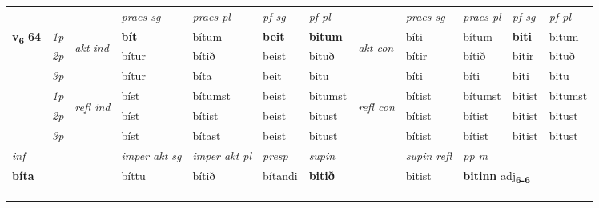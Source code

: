 \begin{longtable}[l]{X>{\footnotesize\itshape}llXXXXlXXXX}
 & &   & \textit{praes sg}  & \textit{praes pl}    & \textit{ pf sg} & \textit{pf pl} & & \textit{praes sg}  & \textit{praes pl}    & \textit{pf sg} & \textit{pf pl }  \\ \cmidrule{4-7} \cmidrule{9-12}
 \multirow{2}{*}{{{\textbf{v{\textsubscript{6}}} \Large{\textbf{64}}}}}  & 1p & \multirow{3}{*}{\begin{turn}{90}\textit{akt ind}\end{turn}} & \textbf{bít} & bítum & \textbf{beit} & \textbf{bitum} & \multirow{3}{*}{\begin{turn}{90}\textit{akt con}\end{turn}} &bíti & bítum & \textbf{biti} & bitum\\*
 & 2p &  &  bítur  & bítið & beist & bituð & & bítir & bítið & bitir & bituð \\*
 & 3p &  & bítur & bíta & beit & bitu & & bíti & bíti& biti & bitu \\*
\cmidrule{4-7} \cmidrule{9-12}
 & 1p & \multirow{3}{*}{\begin{turn}{90}\textit{refl ind}\end{turn}}  & bíst & bítumst & beist & bitumst & \multirow{3}{*}{\begin{turn}{90}\textit{refl con}\end{turn}}  &bítist & bítumst & bitist & bitumst \\*
 & 2p &  & bíst & bítist & beist & bitust & &bítist & bítist & bitist & bitust \\*
 & 3p  & & bíst & bítast & beist & bitust & & bítist & bítist& bitist & bitust \\*
\cmidrule{4-7} \cmidrule{9-12}

   {\textit{inf}} & &  & \textit{imper akt sg} & \textit{imper akt pl}   & \textit{presp} & \textit{supin} && \textit{supin refl} & \textit{pp m} \\*
  {\textbf{bíta}} & && bíttu  & bítið   & bítandi &  \textbf{bitið} && bitist & \multicolumn{2}{l}{\textbf{bitinn} adj\textbf{\textsubscript{6-6}}} \\*

\midrule
 & \\*
   & \\*
  & \\
   \midrule


\end{longtable}
